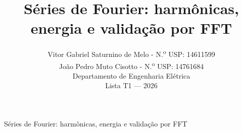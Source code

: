 \documentclass[letterpaper,journal]{IEEEtran}
\begin{document}
\title{Séries de Fourier: harmônicas, energia e validação por FFT}

\author{Vitor Gabriel Saturnino de Melo - N.\textsuperscript{o} USP: 14611599\\
João Pedro Muto Cisotto - N.\textsuperscript{o} USP: 14761684\\[0.5ex]
\normalsize Departamento de Engenharia Elétrica\\
\normalsize Lista T1 --- 2026}

%
{Séries de Fourier: harmônicas, energia e validação por FFT}

\maketitle
\raggedbottom





















%
\end{document}
